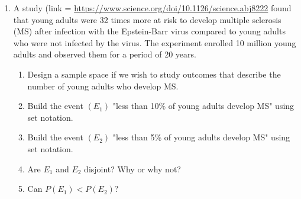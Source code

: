\begin{enumerate}
   \item A study (link = \href{here}{https://www.science.org/doi/10.1126/science.abj8222} found that young adults were 32 times more at risk to develop multiple sclerosis (MS) after infection with the Epstein-Barr virus compared to young adults who were not infected by the virus. The experiment enrolled 10 million young adults and observed them for a period of 20 years.
   \begin{enumerate}
       \item Design a sample space if we wish to study outcomes that describe the number of young adults who develop MS. 
       \item Build the event $(E_{1})$ "less than 10\% of young adults develop MS" using set notation.
       \item Build the event $(E_{2})$ "less than 5\% of young adults develop MS" using set notation.
       \item Are $E_{1}$ and $E_{2}$ disjoint? Why or why not?
       \item Can $P(E_{1}) < P(E_{2})$?
   \end{enumerate}
   

\end{enumerate}

